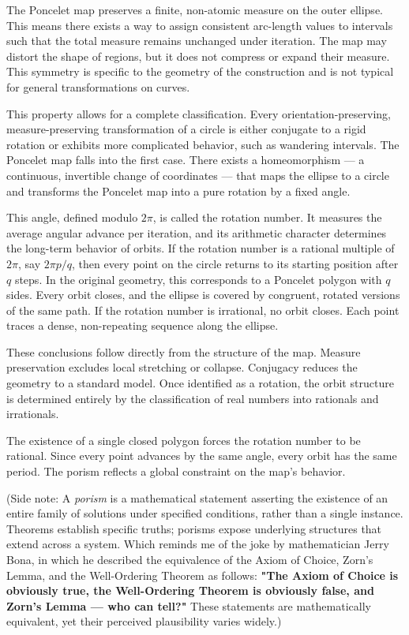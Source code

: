 The Poncelet map preserves a finite, non-atomic measure on the outer ellipse. This means there exists a way to assign consistent arc-length values to intervals such that the total measure remains unchanged under iteration. The map may distort the shape of regions, but it does not compress or expand their measure. This symmetry is specific to the geometry of the construction and is not typical for general transformations on curves.

This property allows for a complete classification. Every orientation-preserving, measure-preserving transformation of a circle is either conjugate to a rigid rotation or exhibits more complicated behavior, such as wandering intervals. The Poncelet map falls into the first case. There exists a homeomorphism — a continuous, invertible change of coordinates — that maps the ellipse to a circle and transforms the Poncelet map into a pure rotation by a fixed angle.

This angle, defined modulo $2\pi$, is called the rotation number. It measures the average angular advance per iteration, and its arithmetic character determines the long-term behavior of orbits. If the rotation number is a rational multiple of $2\pi$, say $2\pi p/q$, then every point on the circle returns to its starting position after $q$ steps. In the original geometry, this corresponds to a Poncelet polygon with $q$ sides. Every orbit closes, and the ellipse is covered by congruent, rotated versions of the same path. If the rotation number is irrational, no orbit closes. Each point traces a dense, non-repeating sequence along the ellipse.

These conclusions follow directly from the structure of the map. Measure preservation excludes local stretching or collapse. Conjugacy reduces the geometry to a standard model. Once identified as a rotation, the orbit structure is determined entirely by the classification of real numbers into rationals and irrationals.

The existence of a single closed polygon forces the rotation number to be rational. Since every point advances by the same angle, every orbit has the same period. The porism reflects a global constraint on the map's behavior.

(Side note: A \emph{porism} is a mathematical statement asserting the existence of an entire family of solutions under specified conditions, rather than a single instance. Theorems establish specific truths; porisms expose underlying structures that extend across a system. Which reminds me of the joke by mathematician Jerry Bona, in which he described the equivalence of the Axiom of Choice, Zorn’s Lemma, and the Well-Ordering Theorem as follows: \textbf{"The Axiom of Choice is obviously true, the Well-Ordering Theorem is obviously false, and Zorn’s Lemma — who can tell?"} These statements are mathematically equivalent, yet their perceived plausibility varies widely.)

